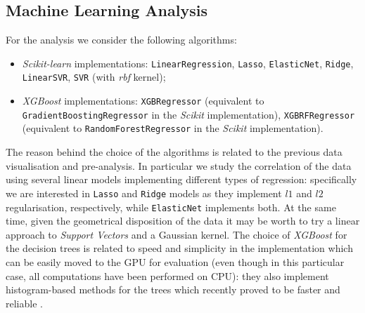 \subsection{Machine Learning Analysis}
    For the analysis we consider the following algorithms:
    \begin{itemize}
        \item \textit{Scikit-learn} implementations:
            \subitem \texttt{LinearRegression},
            \subitem \texttt{Lasso},
            \subitem \texttt{ElasticNet},
            \subitem \texttt{Ridge},
            \subitem \texttt{LinearSVR},
            \subitem \texttt{SVR} (with \textit{rbf} kernel);
        \item \textit{XGBoost} implementations:
            \subitem \texttt{XGBRegressor} (equivalent to \texttt{GradientBoostingRegressor} in the \textit{Scikit} implementation),
            \subitem \texttt{XGBRFRegressor} (equivalent to \texttt{RandomForestRegressor} in the \textit{Scikit} implementation).
    \end{itemize}
    The reason behind the choice of the algorithms is related to the previous data visualisation and pre-analysis. In particular we study the correlation of the data using several linear models implementing different types of regression: specifically we are interested in \texttt{Lasso} and \texttt{Ridge} models as they implement $l1$ and $l2$ regularisation, respectively, while \texttt{ElasticNet} implements both. At the same time, given the geometrical disposition of the data it may be worth to try a linear approach to \textit{Support Vectors} and a Gaussian kernel. The choice of \textit{XGBoost} for the decision trees is related to speed and simplicity in the implementation which can be easily moved to the GPU for evaluation (even though in this particular case, all computations have been performed on CPU): they also implement histogram-based methods for the trees which recently proved to be faster and reliable \cite{NIPS2017_6907}.

